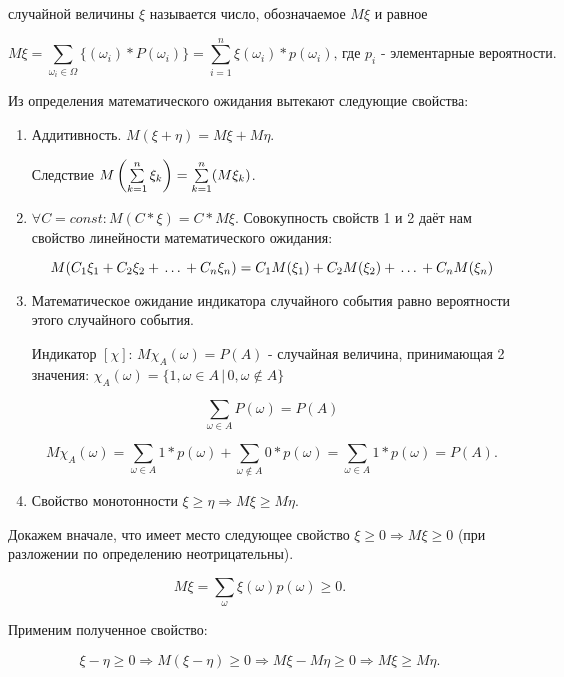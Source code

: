 ﻿\documentclass[a4paper,12pt]{report}
\begin{document}
	 случайной величины $\xi$ называется число, обозначаемое $M\xi$ и равное 

	$$
	  M\xi = \sum_{\omega_i \in \Omega}\{(\omega_i)*P(\omega_i)\} 
	       = \sum^n_{i=1}\xi(\omega_i)*p(\omega_i)
	       \mbox{, где $p_i$ - элементарные вероятности.}
	$$

	Из определения математического ожидания вытекают следующие свойства:


	\begin{enumerate}

	\item	Аддитивность. $M(\xi + \eta) = M\xi + M\eta$. 

		Следствие $M\left(\sum\limits^n_{k=1}\strut\xi_k\right)=\sum\limits^n_{k=1}(M\xi_k)$.


	\item	$\forall C = const: M(C*\xi) = C*M\xi$. Совокупность свойств 1 и 2 даёт нам свойство линейности математического ожидания:

	$$
	  M(C_1\xi_1 + C_2\xi_2 + \,\ldots\, + C_n\xi_n) 
	    = C_1M(\xi_1) + C_2M(\xi_2) + \,\ldots\, + C_nM(\xi_n)
	$$


	\item	Математическое ожидание индикатора случайного события равно вероятности этого случайного события. 

	Индикатор $[\chi]$: $M\chi_A (\omega) = P(A)$ - случайная величина, принимающая 2 значения: 
		$
		  \chi_A(\omega) = \{1, \omega \in A \,|\, 0, \omega \not\in A\}
		$

		$$
		  \sum_{\omega \in A}P(\omega) = P(A)
		$$

		$$
		  M\chi_A(\omega) = \sum_{\omega \in A}1*p(\omega) + \sum_{\omega \not\in A}0*p(\omega)
		                  = \sum_{\omega \in A}1*p(\omega) = P(A).
		$$

	
	\item	Свойство монотонности $\xi \geqslant \eta \Rightarrow M\xi \geqslant M\eta$.

	\end{enumerate}


	Докажем вначале, что имеет место следующее свойство $\xi \geqslant 0 \Rightarrow M\xi \geqslant 0$ (при разложении по определению неотрицательны).

	$$
	  M\xi = \sum_\omega\xi(\omega)p(\omega) \geqslant 0.
	$$
	
	Применим полученное свойство:

	$$
	  \xi - \eta \ge 0 \Rightarrow 
	   M(\xi - \eta) \ge 0 \Rightarrow 
	   M\xi - M\eta \ge 0 \Rightarrow 
	   M\xi \ge M\eta.
	$$
\end{document}

